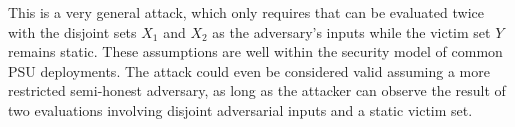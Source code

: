 This is a very general attack, which only requires that 
\PSU{} can be evaluated twice with the disjoint sets $X_1$ and $X_2$ as the adversary's inputs while the victim set $Y$ remains static.
These assumptions are well within the security model of common PSU deployments.
The attack could even be considered valid assuming a more restricted semi-honest adversary,
as long as the attacker can observe the result of two \PSU{} evaluations involving disjoint adversarial inputs and a static victim set.






